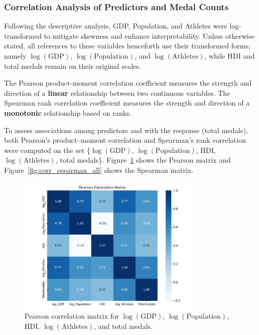 \documentclass[11pt,twoside]{article}
\numberwithin{Theorem}{section}
\numberwithin{Definition}{section}
\numberwithin{Lemma}{section}
\numberwithin{Algorithm}{section}
\numberwithin{equation}{section}
\begin{document}
\subsubsection{Correlation Analysis of Predictors and Medal Counts}


Following the descriptive analysis, GDP, Population, and Athletes were log-transformed to mitigate skewness and enhance interpretability. Unless otherwise stated, all references to these variables henceforth use their transformed forms, namely $\log(\mathrm{GDP})$, $\log(\mathrm{Population})$, and $\log(\mathrm{Athletes})$, while HDI and total medals remain on their original scales.

The Pearson product-moment correlation coefficient measures the strength and direction of a \textbf{linear} relationship between two continuous variables\cite{pearson1896}. The Spearman rank correlation coefficient measures the strength and direction of a \textbf{monotonic} relationship based on ranks\cite{spearman1904}.

To assess associations among predictors and with the response (total medals), both Pearson’s product--moment correlation and Spearman’s rank correlation were computed on the set \{$\log(\mathrm{GDP})$, $\log(\mathrm{Population})$, HDI, $\log(\mathrm{Athletes})$, total medals\}. Figure~\ref{fig:corr_pearson_all} shows the Pearson matrix and Figure~\ref{fig:corr_spearman_all} shows the Spearman matrix.

\begin{figure}[htbp]
  \centering
  \includegraphics[width=0.78\textwidth]{pearson_correlation_matrix.png}
  \caption{Pearson correlation matrix for $\log(\mathrm{GDP})$, $\log(\mathrm{Population})$, HDI, $\log(\mathrm{Athletes})$, and total medals.}
  \label{fig:corr_pearson_all}
\end{figure}
\end{document}
